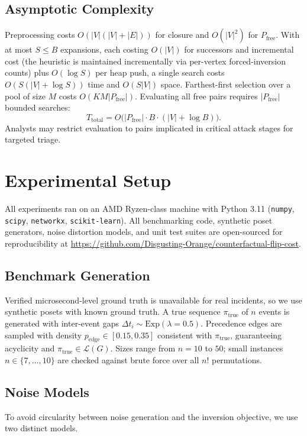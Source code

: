 \documentclass{ieeeaccess}
\newcommand{\Pfree}{P_{\mathrm{free}}}
\newcommand{\Lin}{\mathcal{L}}
\begin{document}
\subsection{Asymptotic Complexity}
Preprocessing costs $O(|V|(|V|+|E|))$ for closure and $O(|V|^2)$ for $\Pfree$. With at most $S\le B$ expansions, each costing $O(|V|)$ for successors and incremental cost (the heuristic is maintained incrementally via per-vertex forced-inversion counts) plus $O(\log S)$ per heap push, a single search costs $O(S(|V|+\log S))$ time and $O(S|V|)$ space. Farthest-first selection over a pool of size $M$ costs $O(KM|\Pfree|)$. Evaluating all free pairs requires $|\Pfree|$ bounded searches:
\begin{equation}
T_{\mathrm{total}}=O\big(|\Pfree|\cdot B\cdot(|V|+\log B)\big).
\end{equation}
Analysts may restrict evaluation to pairs implicated in critical attack stages for targeted triage.

\section{Experimental Setup}\label{sec:setup}
All experiments ran on an AMD Ryzen-class machine with Python 3.11 (\texttt{numpy}, \texttt{scipy}, \texttt{networkx}, \texttt{scikit-learn}). All benchmarking code, synthetic poset generators, noise distortion models, and unit test suites are open-sourced for reproducibility at \url{https://github.com/Disgusting-Orange/counterfactual-flip-cost}.

\subsection{Benchmark Generation}
Verified microsecond-level ground truth is unavailable for real incidents, so we use synthetic posets with known ground truth. A true sequence $\pi_{\mathrm{true}}$ of $n$ events is generated with inter-event gaps $\Delta t_i\sim\mathrm{Exp}(\lambda=0.5)$. Precedence edges are sampled with density $p_{\mathrm{edge}}\in[0.15,0.35]$ consistent with $\pi_{\mathrm{true}}$, guaranteeing acyclicity and $\pi_{\mathrm{true}}\in\Lin(G)$. Sizes range from $n=10$ to $50$; small instances $n\in\{7,\dots,10\}$ are checked against brute force over all $n!$ permutations.

\subsection{Noise Models}
To avoid circularity between noise generation and the inversion objective, we use two distinct models.
\end{document}

